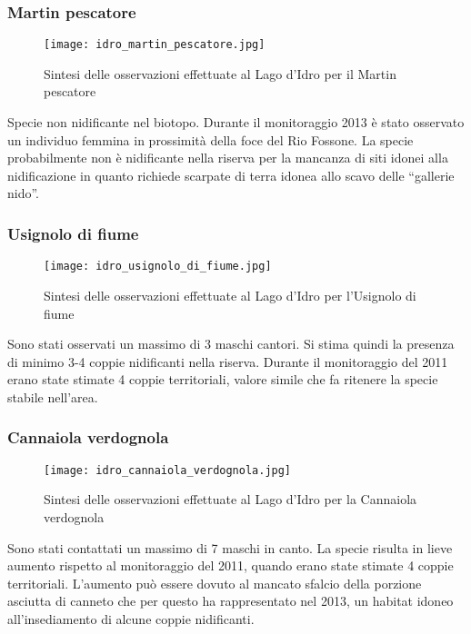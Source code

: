 \documentclass[11pt,a4paper,twoside]{memoir}
\begin{document}
\subsubsection{Martin pescatore}
\vspace*{\fill} \begin{figure}[H]
  \centering
  \texttt{[image: idro\_martin\_pescatore.jpg]}
  \caption{Sintesi delle osservazioni effettuate al Lago d'Idro per il Martin pescatore}
\end{figure}\vspace*{\fill}
Specie non nidificante nel biotopo. Durante il monitoraggio 2013 è stato osservato un individuo femmina in prossimità della foce del Rio Fossone. La specie probabilmente non è nidificante nella riserva per la mancanza di siti idonei alla nidificazione in quanto richiede scarpate di terra idonea allo scavo delle “gallerie nido”. 
\subsubsection{Usignolo di fiume}
\vspace*{\fill} \begin{figure}[H]
  \centering
  \texttt{[image: idro\_usignolo\_di\_fiume.jpg]}
  \caption{Sintesi delle osservazioni effettuate al Lago d'Idro per l'Usignolo di fiume}
\end{figure}\vspace*{\fill}
Sono stati osservati un massimo di 3 maschi cantori. Si stima quindi la presenza di minimo 3-4 coppie nidificanti nella riserva. Durante il monitoraggio del 2011 erano state stimate 4 coppie territoriali, valore simile che fa ritenere la specie stabile nell'area.
\subsubsection{Cannaiola verdognola}
\vspace*{\fill} \begin{figure}[H]
  \centering
  \texttt{[image: idro\_cannaiola\_verdognola.jpg]}
  \caption{Sintesi delle osservazioni effettuate al Lago d'Idro per la Cannaiola verdognola}
\end{figure}\vspace*{\fill}
Sono stati contattati un massimo di 7 maschi in canto. La specie risulta in lieve aumento rispetto al monitoraggio del 2011, quando erano state stimate 4 coppie territoriali. L'aumento può essere dovuto al mancato sfalcio della porzione asciutta di canneto che per questo ha rappresentato nel 2013, un habitat idoneo all’insediamento di alcune coppie nidificanti.
\end{document}
